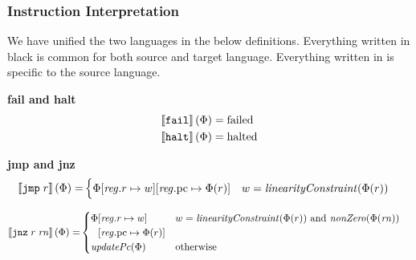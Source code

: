 \documentclass[a4paper]{article}
\begin{document}
\subsubsection{Instruction Interpretation}
We have unified the two languages in the below definitions. Everything written in black is common for both source and target language. Everything written in  is specific to the source language.

\noindent\textbf{fail and halt}\\
\begin{align*}
  \left\llbracket \texttt{{\color{black} fail}} \right\rrbracket(\Phi) = & \; \mathrm{failed} \\
  \left\llbracket \texttt{{\color{black} halt}} \right\rrbracket(\Phi) = & \; \mathrm{halted}
\end{align*}

\noindent\textbf{jmp and jnz}\\
\begin{align*}
  \sem{\tjmp{r}}(\Phi) = &  
                     \begin{cases}
                       \Phi\updReg{r}{w}\updReg{\pcreg}{\Phi(r)} & w = \linCons{\Phi(r)}
                     \end{cases}
\end{align*}

\begin{align*}
  \sem{\tjnz{r}{\rn}}(\Phi) = &       
                             \begin{cases}
                               \arraycolsep=0pt
                               \begin{array}[t]{rl}
                                 \Phi&\updReg{r}{w}\\
                                     &\updReg{\pcreg}{\Phi(r)}
                               \end{array} 
                                              & w = \linCons{\Phi(r)} \tand \nonZero{\Phi(\rn)}\\
                               \updPcAddr{\Phi} & \totherwise
                             \end{cases}
\end{align*}
\end{document}
